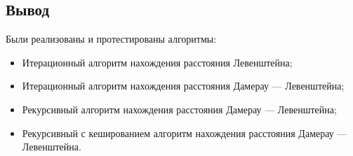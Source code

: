 \newpage

\subsection*{Вывод}

Были реализованы и протестированы алгоритмы:
\begin{itemize}
    \item Итерационный алгоритм нахождения расстояния Левенштейна;
    \item Итерационный алгоритм нахождения расстояния Дамерау --- Левенштейна;
    \item Рекурсивный алгоритм нахождения расстояния Дамерау --- Левенштейна;
    \item Рекурсивный с кешированием алгоритм нахождения расстояния Дамерау --- Левенштейна.
\end{itemize}
